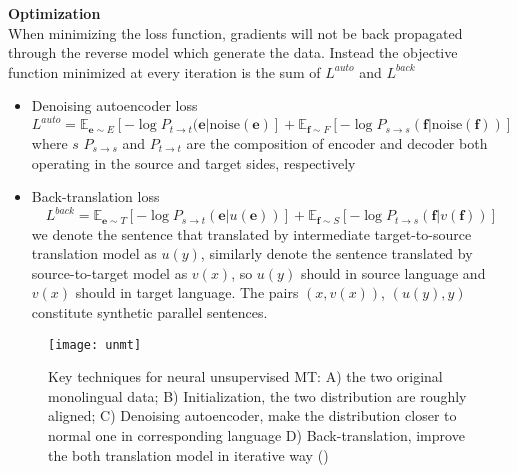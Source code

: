 \textbf{Optimization}\\
When minimizing the loss function, gradients will not be back propagated through the reverse model which generate the data. Instead the objective function minimized at every iteration is the sum of $L^{auto}$ and $L^{back}$
\begin{itemize}
	\item Denoising autoencoder loss
	\[ L^{auto} = \mathbb{E}_{\bm{e}\sim E}[-\log P_{t\rightarrow t}(\bm{e}|\text{noise}(\bm{e})] + \mathbb{E}_{\bm{f}\sim F} [-\log P_{s\rightarrow s}(\bm{f}|\text{noise}(\bm{f}))]\]
	where $s$ $P_{s\rightarrow s}$ and $P_{t\rightarrow t}$ are the composition of encoder and decoder both operating in the source and target sides, respectively
	\item Back-translation loss
	\[ L^{back} = \mathbb{E}_{\bm{e}\sim T} [-\log P_{s\rightarrow t}(\bm{e}|u(\bm{e}))] +  \mathbb{E}_{\bm{f}\sim S} [-\log P_{t\rightarrow s}(\bm{f}|v(\bm{f}))]\]
	 we denote the sentence that translated by intermediate target-to-source translation model as $u(y)$, similarly denote the sentence translated by source-to-target model as $v(x)$, so $u(y)$ should in source language and $v(x)$ should in target language. The pairs $(x, v(x))$, $(u(y), y)$ constitute synthetic parallel  sentences.
\end{itemize}

\begin{figure}[H]
	\texttt{[image: unmt]}
	\caption{Key techniques for neural unsupervised MT: A) the two original monolingual data; B) Initialization, the two distribution are roughly aligned; C) Denoising autoencoder, make the distribution closer to normal one in corresponding language D) Back-translation, improve the both translation model in iterative way (\cite{lample2018phrase})}
	
\end{figure}









